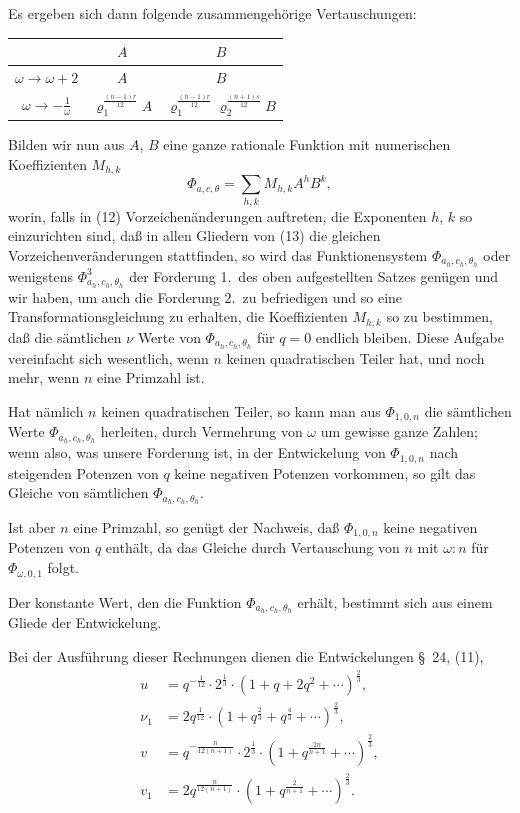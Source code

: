 \documentclass[12pt,a4paper]{article}
\theoremstyle{definition}
\begin{document}
Es ergeben sich dann folgende zusammengehörige Vertauschungen:

\begin{center}
\begin{tabular}{c|cc}
& $A$ & $B$ \\
\midrule
$\omega \to \omega + 2$ & $A$ & $B$ \\
$\omega \to -\frac{1}{\omega}$ & $\varrho_1^{\frac{(n-1)r}{12}} A$ & $\varrho_1^{\frac{(n-1)r}{12}} \varrho_2^{\frac{(n+1)s}{12}} B$ \\
\end{tabular}
\end{center}

Bilden wir nun aus $A$, $B$ eine ganze rationale Funktion mit numerischen Koeffizienten $M_{h,k}$
\begin{equation}\label{eq:73-15}
\Phi_{a,c,\theta} = \sum_{h,k} M_{h,k} A^h B^k,
\end{equation}
worin, falls in (12) Vorzeichenänderungen auftreten, die Exponenten $h$, $k$ so einzurichten sind, daß in allen Gliedern von (13) die gleichen Vorzeichenveränderungen stattfinden, so wird das Funktionensystem $\Phi_{a_h,c_h,\theta_h}$ oder wenigstens $\Phi_{a_h,c_h,\theta_h}^3$ der Forderung 1.\ des oben aufgestellten Satzes genügen und wir haben, um auch die Forderung 2.\ zu befriedigen und so eine Transformationsgleichung zu erhalten, die Koeffizienten $M_{h,k}$ so zu bestimmen, daß die sämtlichen $\nu$ Werte von $\Phi_{a_h,c_h,\theta_h}$ für $q = 0$ endlich bleiben. Diese Aufgabe vereinfacht sich wesentlich, wenn $n$ keinen quadratischen Teiler hat, und noch mehr, wenn $n$ eine Primzahl ist.

Hat nämlich $n$ keinen quadratischen Teiler, so kann man aus $\Phi_{1,0,n}$ die sämtlichen Werte $\Phi_{a_h,c_h,\theta_h}$ herleiten, durch Vermehrung von $\omega$ um gewisse ganze Zahlen; wenn also, was unsere Forderung ist, in der Entwickelung von $\Phi_{1,0,n}$ nach steigenden Potenzen von $q$ keine negativen Potenzen vorkommen, so gilt das Gleiche von sämtlichen $\Phi_{a_h,c_h,\theta_h}$.

Ist aber $n$ eine Primzahl, so genügt der Nachweis, daß $\Phi_{1,0,n}$ keine negativen Potenzen von $q$ enthält, da das Gleiche durch Vertauschung von $n$ mit $\omega:n$ für $\Phi_{\omega,0,1}$ folgt.

Der konstante Wert, den die Funktion $\Phi_{a_h,c_h,\theta_h}$ erhält, bestimmt sich aus einem Gliede der Entwickelung.

Bei der Ausführung dieser Rechnungen dienen die Entwickelungen \S\ 24, (11),
\[
\begin{aligned}
u &= q^{-\frac{1}{12}} \cdot 2^{\frac{1}{3}} \cdot (1 + q + 2q^2 + \cdots)^{\frac{2}{3}}, \\
\nu_1 &= 2q^{\frac{1}{12}} \cdot (1 + q^{\frac{2}{3}} + q^{\frac{4}{3}} + \cdots)^{\frac{2}{3}}, \\
v &= q^{-\frac{n}{12(n+1)}} \cdot 2^{\frac{1}{3}} \cdot (1 + q^{\frac{2n}{n+1}} + \cdots)^{\frac{2}{3}}, \\
v_1 &= 2q^{\frac{n}{12(n+1)}} \cdot (1 + q^{\frac{2}{n+1}} + \cdots)^{\frac{2}{3}}.
\end{aligned}
\]
\end{document}

